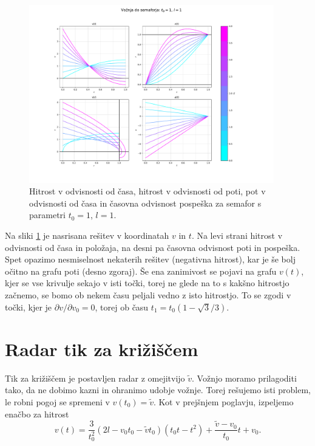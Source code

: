\documentclass[a4paper, 12pt, slovene]{article}
\numberwithin{equation}{section}
\newcommand{\pd}{\partial}
\begin{document}
\begin{figure}[H]
\centering
\includegraphics[width=0.95\textwidth]{grafi/dimenzijsko.pdf}
\caption{Hitrost v odvisnosti od časa, hitrost v odvisnosti od poti, pot v odvisnosti od časa in časovna odvisnost pospeška za semafor s parametri $t_0=1$, $l=1$.}
\label{f:hitrosti-4graf}
\end{figure}

Na sliki \ref{f:hitrosti-4graf} je nasrisana rešitev v koordinatah $v$ in $t$. Na levi strani hitrost v odvisnosti od časa in položaja, na desni pa časovna odvisnost poti in pospeška. Spet opazimo nesmiselnost nekaterih rešitev (negativna hitrost), kar je še bolj očitno na grafu poti (desno zgoraj). Še ena zanimivost se pojavi na grafu $v(t)$, kjer se vse krivulje sekajo v isti točki, torej ne glede na to s kakšno hitrostjo začnemo, se bomo ob nekem času peljali vedno z isto hitrostjo. To se zgodi v točki, kjer je $\pd v/\pd v_0=0$, torej ob času $t_1 = t_0 (1-\sqrt{3}/3)$.




\section{Radar tik za križiščem}
Tik za križiščem je postavljen radar z omejitvijo $\tilde{v}$. Vožnjo moramo prilagoditi tako, da ne dobimo kazni in ohranimo udobje vožnje. Torej rešujemo isti problem, le robni pogoj se spremeni v $v(t_0) = \tilde{v}$. Kot v prejšnjem poglavju, izpeljemo enačbo za hitrost
\begin{equation}
v(t) = \frac{3}{t_0^2}(2l-v_0t_0-\tilde{v}t_0)(t_0t-t^2) + \frac{\tilde{v}-v_0}{t_0}t + v_0.
\end{equation}
\end{document}
